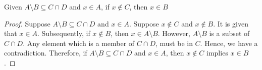 
\begin{theorem}
  Given $A\setminus B \subseteq C \cap D$ and $x \in A$, if $x \notin C$, then $x
  \in B$
\end{theorem}

\begin{proof}
  Suppose $A\setminus B \subseteq C \cap D$ and $x \in A$. Suppose $x \notin
  C$ and $x \notin B$. It is given that $x \in A$. Subsequently, if $x \notin
  B$, then $x \in A\setminus B$. However, $A\setminus B$ is a subset of $C
  \cap D$. Any element which is a member of $C \cap D$, must be in $C$. Hence,
  we have a contradiction. Therefore, if $A\setminus B \subseteq C \cap D$ and
  $x \in A$, then $x \notin C$ implies $x \in B$.
\end{proof}
